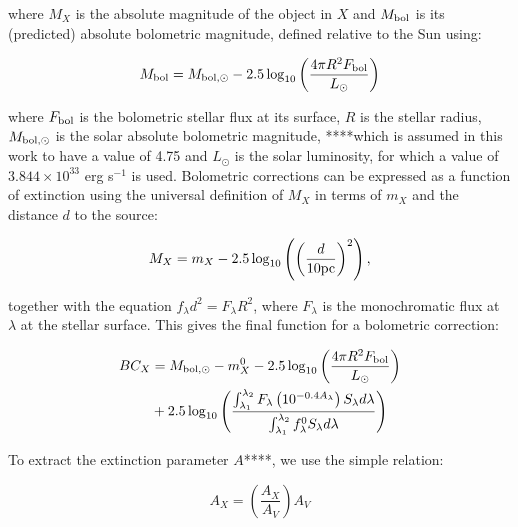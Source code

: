 \documentclass[12pt, a4paper]{report}
\begin{document}
where $M_{X}$ is the absolute magnitude of the object in $X$ and $M_{\textnormal{bol}}$ is its (predicted) absolute bolometric magnitude, defined relative to the Sun using:

\begin{equation}
M_{\textnormal{bol}} = M_{\textnormal{bol},\odot} - 2.5 \log_{10} \left( \frac{4\pi R^{2}F_{\textnormal{bol}}}{L_{\odot}} \right)
\label{mbol_sun}
\end{equation}

where  $F_{\textnormal{bol}}$ is the bolometric stellar flux at its surface, $R$ is the stellar radius, $M_{\textnormal{bol},\odot}$ is the solar absolute bolometric magnitude, ****which is assumed in this work to have a value of 4.75 and $L_{\odot}$ is the solar luminosity, for which a value of $3.844 \times 10^{33}$ erg s$^{-1}$ is used. Bolometric corrections can be expressed as a function of extinction using the universal definition of $M_{X}$ in terms of $m_{X}$ and the distance $d$ to the source:

\begin{equation}
M_{X} = m_{X} - 2.5 \log_{10}\left( \left( \frac{d}{10 \textnormal{pc}} \right)^{2} \right),
\label{abs_mag_def}
\end{equation}

together with the equation $f_{\lambda}d^{2}=F_{\lambda}R^{2}$, where $F_{\lambda}$ is the monochromatic flux at $\lambda$ at the stellar surface. This gives the final function for a bolometric correction:

\begin{align}
BC_{X} &= M_{\textnormal{bol},\odot} - m_{X}^{0} - 2.5 \log_{10} \left( \frac{4\pi R^{2}F_{\textnormal{bol}}}{L_{\odot}} \right) \\ &+ 2.5 \log_{10} \left( \frac{\int_{\lambda_{1}}^{\lambda_{2}} F_{\lambda} \left( 10^{-0.4 A_{\lambda}} \right) S_{\lambda} d\lambda}{\int_{\lambda_{1}}^{\lambda_{2}} f_{\lambda}^{0} S_{\lambda} d\lambda} \right)
\label{BC_extinc}
\end{align}


To extract the extinction parameter $A$****, we use the simple relation:

\begin{equation}
A_{X} = \left( \frac{A_{X}}{A_{V}} \right) A_{V}
\label{ratio_eq}
\end{equation}
\end{document}
